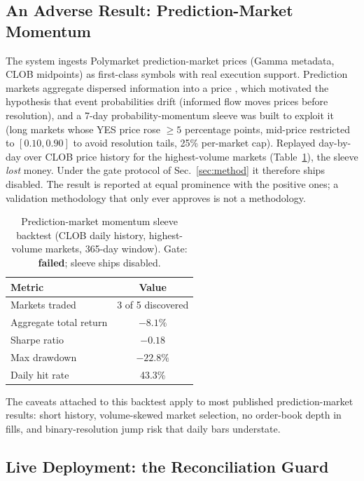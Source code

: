 \documentclass[10pt,twocolumn]{IEEEtran}
\begin{document}
\subsection{An Adverse Result: Prediction-Market Momentum}
\label{sec:polymarket}

The system ingests Polymarket prediction-market prices (Gamma metadata,
CLOB midpoints) as first-class symbols with real execution support. Prediction
markets aggregate dispersed information into a price
\cite{wolfers2004prediction}, which motivated the hypothesis that event
probabilities drift (informed flow moves prices before resolution), and a
7-day probability-momentum sleeve was built to exploit it (long markets whose
YES price rose $\geq 5$ percentage points, mid-price restricted to
$[0.10, 0.90]$ to avoid resolution tails, 25\% per-market cap). Replayed
day-by-day over CLOB price history for the highest-volume markets
(Table~\ref{tab:pm}), the sleeve \emph{lost} money. Under the gate protocol
of Sec.~\ref{sec:method} it therefore ships disabled. The result is reported
at equal prominence with the positive ones; a validation methodology that
only ever approves is not a methodology.

\begin{table}[t]
\caption{Prediction-market momentum sleeve backtest (CLOB daily history,
highest-volume markets, 365-day window). Gate: \textbf{failed}; sleeve
ships disabled.}
\label{tab:pm}
\centering
\begin{tabular}{lc}
\toprule
Metric & Value \\
\midrule
Markets traded & 3 of 5 discovered \\
Aggregate total return & $-8.1\%$ \\
Sharpe ratio & $-0.18$ \\
Max drawdown & $-22.8\%$ \\
Daily hit rate & 43.3\% \\
\bottomrule
\end{tabular}
\end{table}

The caveats attached to this backtest apply to most published
prediction-market results: short history, volume-skewed market selection,
no order-book depth in fills, and binary-resolution jump risk that daily
bars understate.

\subsection{Live Deployment: the Reconciliation Guard}
\label{sec:live}
\end{document}
